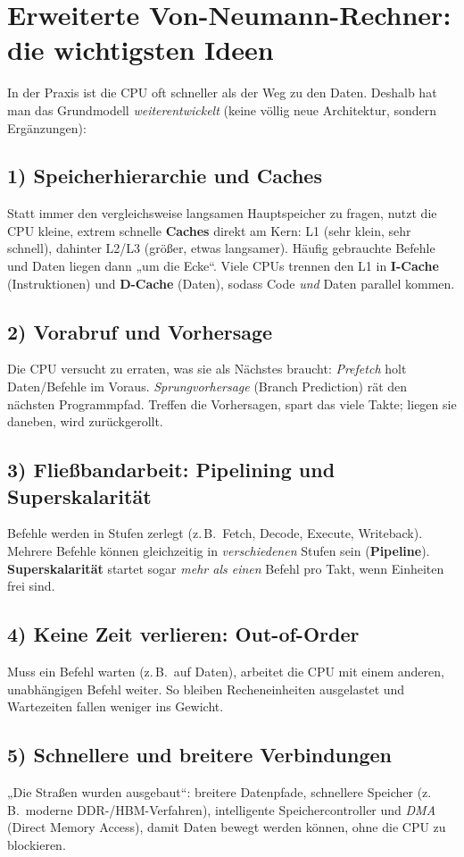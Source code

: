 \documentclass[../skript/main.tex]{subfiles}
\begin{document}
\section{Erweiterte Von-Neumann-Rechner: die wichtigsten Ideen}
In der Praxis ist die CPU oft schneller als der Weg zu den Daten. Deshalb hat man das Grundmodell
\emph{weiterentwickelt} (keine völlig neue Architektur, sondern Ergänzungen):

\subsection*{1) Speicherhierarchie und Caches}
Statt immer den vergleichsweise langsamen Hauptspeicher zu fragen, nutzt die CPU kleine,
extrem schnelle \textbf{Caches} direkt am Kern:
L1 (sehr klein, sehr schnell), dahinter L2/L3 (größer, etwas langsamer).
Häufig gebrauchte Befehle und Daten liegen dann „um die Ecke“.
Viele CPUs trennen den L1 in \textbf{I-Cache} (Instruktionen) und \textbf{D-Cache} (Daten),
sodass Code \emph{und} Daten parallel kommen.

\subsection*{2) Vorabruf und Vorhersage}
Die CPU versucht zu erraten, was sie als Nächstes braucht:
\emph{Prefetch} holt Daten/Befehle im Voraus.
\emph{Sprungvorhersage} (Branch Prediction) rät den nächsten Programmpfad.
Treffen die Vorhersagen, spart das viele Takte; liegen sie daneben, wird zurückgerollt.

\subsection*{3) Fließbandarbeit: Pipelining und Superskalarität}
Befehle werden in Stufen zerlegt (z.\,B.\ Fetch, Decode, Execute, Writeback).
Mehrere Befehle können gleichzeitig in \emph{verschiedenen} Stufen sein (\textbf{Pipeline}).
\textbf{Superskalarität} startet sogar \emph{mehr als einen} Befehl pro Takt, wenn Einheiten frei sind.

\subsection*{4) Keine Zeit verlieren: Out-of-Order}
Muss ein Befehl warten (z.\,B.\ auf Daten), arbeitet die CPU mit einem anderen, unabhängigen
Befehl weiter. So bleiben Recheneinheiten ausgelastet und Wartezeiten fallen weniger ins Gewicht.

\subsection*{5) Schnellere und breitere Verbindungen}
„Die Straßen wurden ausgebaut“: breitere Datenpfade, schnellere Speicher (z.\,B.\ moderne DDR-/HBM-Verfahren),
intelligente Speichercontroller und \emph{DMA} (Direct Memory Access), damit Daten bewegt werden können,
ohne die CPU zu blockieren.
\end{document}
